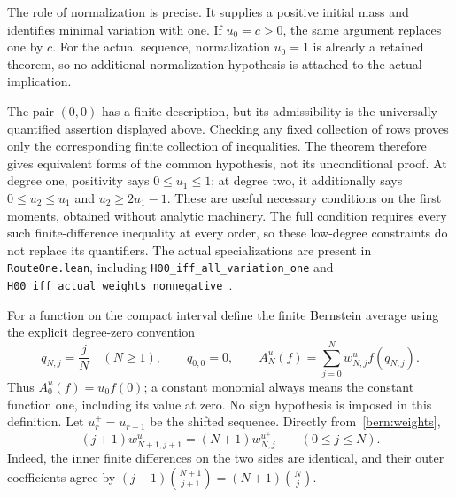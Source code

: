 The role of normalization is precise. It supplies a positive initial
mass and identifies minimal variation with one. If $u_0=c>0$, the
same argument replaces one by $c$. For the actual sequence,
normalization $u_0=1$ is already a retained theorem, so no additional
normalization hypothesis is attached to the actual implication.

The pair $(0,0)$ has a finite description, but its admissibility is
the universally quantified assertion displayed above. Checking any
fixed collection of rows proves only the corresponding finite
collection of inequalities. The theorem therefore gives equivalent
forms of the common hypothesis, not its unconditional proof.
At degree one, positivity says $0\le u_1\le1$; at degree two,
it additionally says $0\le u_2\le u_1$ and $u_2\ge2u_1-1$.
These are useful necessary conditions on the first moments, obtained
without analytic machinery. The full condition requires every such
finite-difference inequality at every order, so these low-degree
constraints do not replace its quantifiers.
The actual specializations are present in \texttt{RouteOne.lean},
including \texttt{H00\_iff\_all\_variation\_one} and
\texttt{H00\_iff\_actual\_weights\_nonnegative}~\cite{source}.

\label{bern:recurrence-page}

For a function on the compact interval define the finite Bernstein
average using the explicit degree-zero convention
\[
 q_{N,j}=\frac jN\quad(N\ge1),\qquad q_{0,0}=0,
 \qquad A_N^u(f)=\sum_{j=0}^Nw^u_{N,j}f(q_{N,j}).
\]
Thus $A_0^u(f)=u_0f(0)$; a constant monomial always means the
constant function one, including its value at zero. No sign hypothesis
is imposed in this definition. Let $u^+_r=u_{r+1}$ be the shifted
sequence. Directly from~\eqref{bern:weights},
\begin{equation}\label{bern:shift}
 (j+1)w^u_{N+1,j+1}=(N+1)w^{u^+}_{N,j}
 \qquad(0\le j\le N).
\end{equation}
Indeed, the inner finite differences on the two sides are identical,
and their outer coefficients agree by
$(j+1)\binom{N+1}{j+1}=(N+1)\binom Nj$.

